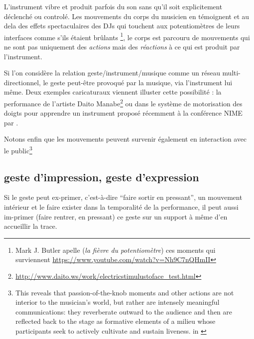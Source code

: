 L'instrument vibre et produit parfois du son sans qu'il soit explicitement déclenché ou controlé. Les mouvements du corps du musicien en témoignent et au dela des effets spectaculaires des DJs qui touchent aux potentiomètres de leurs interfaces comme s'ils étaient brûlants \footnote{Mark J. Butler apelle  (\textit{la fièvre du potentiomètre}) ces moments qui surviennent  \cite{butler_playing_2014} \url{https://www.youtube.com/watch?v=Nh9C7nQHmII}}, le corps est parcouru de mouvements qui ne sont pas uniquement des \textit{actions} mais des \textit{réactions} à ce qui est produit par l'instrument. 


Si l'on considère la relation geste/instrument/musique comme un réseau multi-directionnel, le geste peut-être provoqué par la musique, via l'instrument lui même. Deux exemples caricaturaux viennent illuster cette possibilité : la performance  de l'artiste Daito Manabe\footnote{\url{http://www.daito.ws/work/electricstimulustoface_test.html}} ou dans le système de motorisation des doigts pour apprendre un instrument proposé récemment à la conférence NIME par \cite{zhang_adaptive_2019}.


Notons enfin que les mouvements peuvent survenir également en interaction avec le public\footnote{This reveals that passion-of-the-knob moments and other actions are not interior to the musician’s world, but rather are intensely meaningful communications: they reverberate outward to the audience and then are reflected back to the stage as formative elements of a milieu whose participants seek to actively cultivate and sustain liveness. in \cite{butler_playing_2014}} 



\subsection*{geste d'impression, geste d'expression}
Si le geste peut ex-primer, c'est-à-dire ``faire sortir en pressant'', un mouvement intérieur et le faire exister dans la temporalité de la performance, il peut aussi im-primer (faire rentrer, en pressant) ce geste sur un support à même d'en accueillir la trace.

